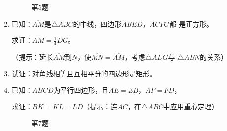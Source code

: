 \begin{enumerate}
\begin{figure}
    \centering
    \begin{tikzpicture}[>=latex, scale=1]
    \end{tikzpicture}
    \caption*{第5题}
\end{figure}

\item 已知：$\overline{AM}$是$\triangle ABC$的中线，四边形$ABED$，$ACFG$都
是正方形。

求证：$\overline{AM}=\frac{1}{4}\overline{DG}$。

（提示：延长$\overline{AM}$到$N$，使$\overline{MN}=\overline{AM}$，考虑$\triangle ADG$与
$\triangle ABN$的关系）
\item 试证：对角线相等且互相平分的四边形是矩形。
\item 已知：$ABCD$为平行四边形，且$\overline{AE}=\overline{EB}$，$\overline{AF}=\overline{FD}$，

求证：$\overline{BK}=\overline{KL}=\overline{LD}$（提示：连$\overline{AC}$，在$\triangle ABC$中应用重心定理）

\begin{figure}
    \begin{minipage}[t]{0.48\linewidth}
    \centering
\begin{tikzpicture}[>=latex, scale=1]

    \end{tikzpicture}
    \caption*{第7题}
    \end{minipage}
    \begin{minipage}[t]{0.48\linewidth}
    \centering
    \begin{tikzpicture}[>=latex, scale=1]


\end{tikzpicture}
\end{minipage}
\end{figure}
\end{enumerate}
